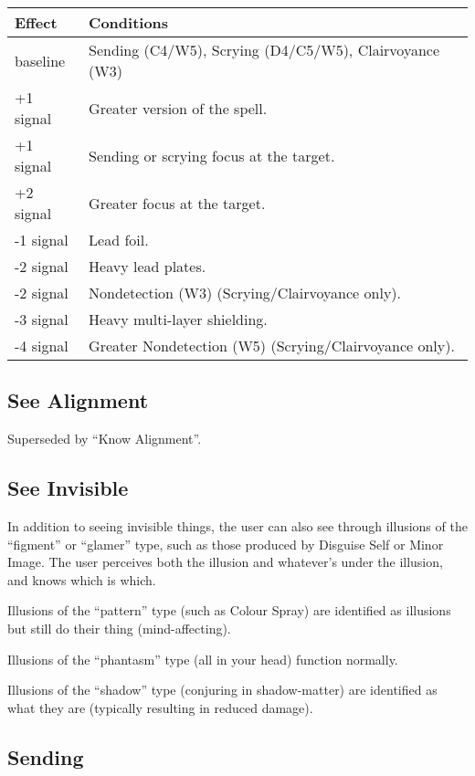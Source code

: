 \begin{tabular}{l|l}\hline
\textbf{Effect} & \textbf{Conditions} \\ \hline
%
baseline & Sending (C4/W5), Scrying (D4/C5/W5), Clairvoyance (W3) \\
\hline
%
+1 signal & Greater version of the spell. \\
+1 signal & Sending or scrying focus at the target. \\
+2 signal & Greater focus at the target. \\
\hline
%
-1 signal & Lead foil. \\
-2 signal & Heavy lead plates. \\
-2 signal & Nondetection (W3) (Scrying/Clairvoyance only). \\
-3 signal & Heavy multi-layer shielding. \\
-4 signal & Greater Nondetection (W5) (Scrying/Clairvoyance only). \\
\hline
%
\end{tabular}
%

%
\subsection{See Alignment}

Superseded by ``Know Alignment''.
%

%
\subsection{See Invisible}

In addition to seeing invisible things, the user can also see through
illusions of the ``figment'' or ``glamer'' type, such as those produced by
Disguise Self or Minor Image. The user perceives both the illusion and
whatever's under the illusion, and knows which is which.

Illusions of the ``pattern'' type (such as Colour Spray) are identified as
illusions but still do their thing (mind-affecting).

Illusions of the ``phantasm'' type (all in your head) function normally.

Illusions of the ``shadow'' type (conjuring in shadow-matter) are
identified as what they are (typically resulting in reduced damage).
%

%
\subsection{Sending}

